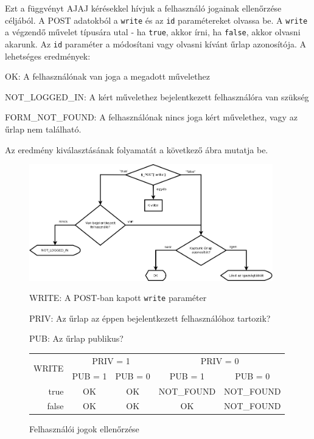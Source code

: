 \documentclass[12pt,a4paper,twoside]{article}
\newcommand{\desc}{
  \begin{description}{}{}
    \setlength\itemsep{0pt}
    \setlength\parskip{0pt}
    \setlength\topsep{0pt}
    \setlength\partopsep{0pt}
    \small}
\newcommand{\ed}{
  \end{description}
}
\begin{document}
Ezt a függvényt AJAJ kérésekkel hívjuk a felhasználó jogainak ellenőrzése
céljából. A POST adatokból a \texttt{write} és az \texttt{id} paramétereket
olvassa be. A \texttt{write} a végzendő művelet típusára utal - ha
\texttt{true}, akkor írni, ha \texttt{false}, akkor olvasni akarunk.
Az \texttt{id} paraméter a módosítani vagy olvasni kívánt űrlap azonosítója.
A lehetséges eredmények:

\desc
  \item[OK:] A felhasználónak van joga a megadott művelethez
  \item[NOT\_LOGGED\_IN:] A kért művelethez bejelentkezett felhasználóra van szükség
  \item[FORM\_NOT\_FOUND:] A felhasználónak nincs joga kért művelethez, vagy az űrlap
    nem található.
\ed

Az eredmény kiválasztásának folyamatát a következő ábra mutatja be.

\begin{figure}[h]
  \centering
  \includegraphics[width=400px]{rights.png}

  \desc\small
    \item[WRITE:] A POST-ban kapott \texttt{write} paraméter
    \item[PRIV:] Az űrlap az éppen bejelentkezett felhasználóhoz tartozik?
    \item[PUB:] Az űrlap publikus?
  \ed\normalsize

  \begin{tabular*}{\textwidth}{r|cc|cc}
    \multirow{2}{*}{WRITE} & \multicolumn{2}{c|}{PRIV = 1} & \multicolumn{2}{c}{PRIV = 0} \\
    & PUB = 1 & PUB = 0 & PUB = 1 & PUB = 0 \\
    \hline
    true  & OK & OK & NOT\_FOUND & NOT\_FOUND \\
    false & OK & OK & OK         & NOT\_FOUND \\
  \end{tabular*}

  \caption{Felhasználói jogok ellenőrzése}\label{fig:rights}
\end{figure}
\end{document}
